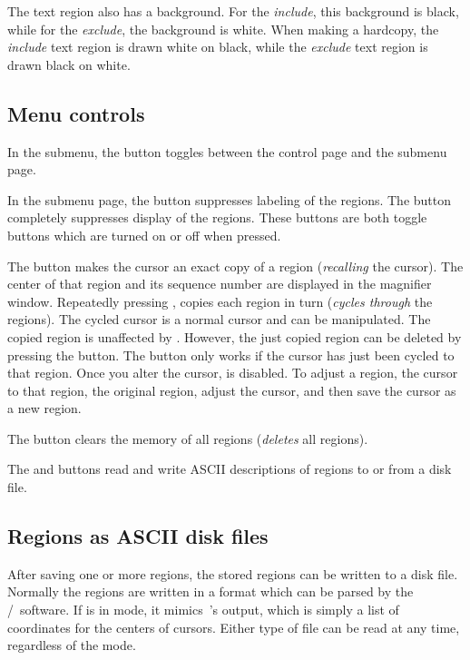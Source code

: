 The text region also has a background.  For the {\em include}, this background
is black, while for the {\em exclude}, the background is white.  When making
a hardcopy, the {\em include} text region is drawn white on black, while the
{\em exclude} text region is drawn black on white.

\subsection{ Menu controls }

In the  submenu, the  button toggles between
the  control page and the  submenu page.

In the  submenu page, the  button suppresses labeling of the
regions.  The  button completely suppresses display of the
regions.  These buttons are both toggle buttons which are turned on or
off when pressed.

The  button makes the cursor an exact copy of a region
({\em recalling} the cursor).  The center of that region and its sequence number are
displayed in the magnifier window.  Repeatedly pressing , copies
each region in turn ({\em cycles through} the regions).  The cycled cursor is
a normal cursor and can be manipulated.  The copied region is unaffected
by .  However, the just copied region can be deleted by pressing
the  button.  The  button only works if the cursor has just
been cycled to that region.  Once you alter the cursor,  is disabled.
To adjust a region,  the cursor to that region,  the original
region, adjust the cursor, and then save the cursor as a new region.

The  button clears the memory of all regions ({\em deletes} all regions).

The  and  buttons read and write ASCII descriptions of regions
to or from a disk file.

\subsection{ Regions as ASCII disk files }

After saving one or more regions, the stored regions can be written to a
disk file.  Normally the regions are written in a format which can be
parsed by the \PROS/\IRAF\ software.  If {\SAO} is in  mode, it
mimics {\IRAF}\,'s  output, which is simply a list of coordinates for
the centers of cursors.  Either type of file can be read at any time,
regardless of the mode.

